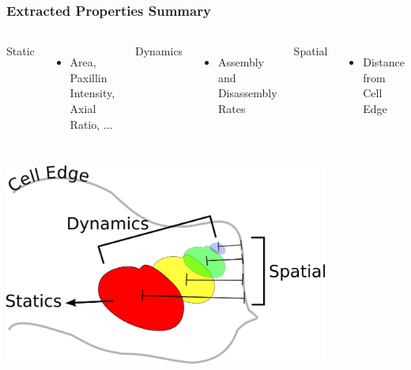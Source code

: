 \documentclass{beamer}
\begin{document}
\begin{frame}
	\frametitle{Extracted Properties Summary}
	\begin{columns}
	Static
		\begin{itemize}
		\item Area, Paxillin Intensity, Axial Ratio, ...
		\end{itemize}
	Dynamics
		\begin{itemize}
		\item Assembly and Disassembly Rates
		\end{itemize}
	Spatial
		\begin{itemize}
		\item Distance from Cell Edge \bigskip
		\end{itemize}
	\end{columns}
	\begin{center}
	\includegraphics[width=0.8\textwidth]{figures/analysis/property_cartoon}
	\end{center}
\end{frame}
\end{document}
